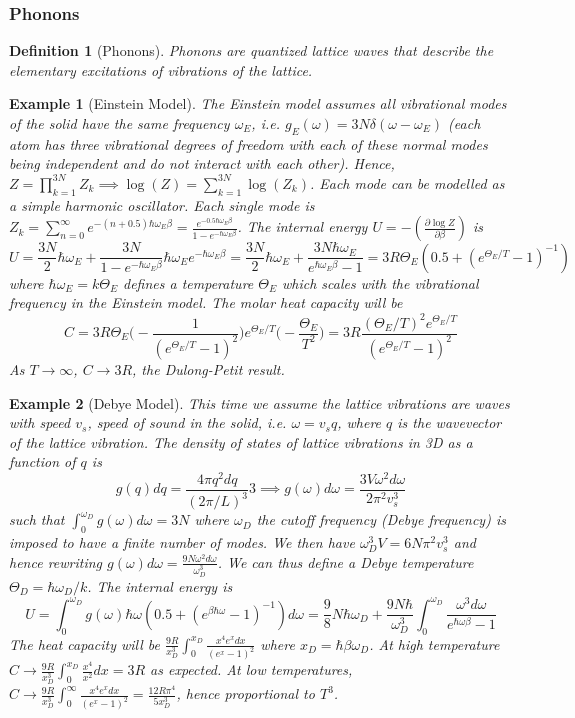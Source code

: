 \documentclass[a4paper]{article}
\newtheorem{eg}{Example}[section]
\theoremstyle{new}
\newtheorem{defi}{Definition}[section]
\begin{document}
\subsubsection*{Phonons}
\begin{defi}[Phonons]
Phonons are quantized lattice waves that describe the elementary excitations of vibrations of the lattice.
\end{defi}
\begin{eg}[Einstein Model]
The Einstein model assumes all vibrational modes of the solid have the same frequency $\omega_E$, i.e. $g_E(\omega)=3N\delta(\omega-\omega_E)$ (each atom has three vibrational degrees of freedom with each of these normal modes being independent and do not interact with each other). Hence, $Z=\prod_{k=1}^{3N}Z_k\implies\log(Z)=\sum_{k=1}^{3N}\log(Z_k)$. Each mode can be modelled as a simple harmonic oscillator. Each single mode is $Z_k=\sum_{n=0}^\infty e^{-(n+0.5)\hbar\omega_E\beta}=\frac{e^{-0.5\hbar\omega_E\beta}}{1-e^{-\hbar\omega_E\beta}}$. The internal energy $U=-(\frac{\partial\log Z}{\partial\beta})$ is
$$U=\frac{3N}{2}\hbar\omega_E+\frac{3N}{1-e^{-\hbar\omega_E\beta}}\hbar\omega_Ee^{-\hbar\omega_E\beta}=\frac{3N}{2}\hbar\omega_E+\frac{3N\hbar\omega_E}{e^{\hbar\omega_E\beta}-1}=3R\Theta_E(0.5+(e^{\Theta_E/T}-1)^{-1})$$
where $\hbar\omega_E=k\Theta_E$ defines a temperature $\Theta_E$ which scales with the vibrational frequency in the Einstein model. The molar heat capacity will be
$$C=3R\Theta_E\bigg(-\frac{1}{(e^{\Theta_E/T}-1)^2}\bigg)e^{\Theta_E/T}\bigg(-\frac{\Theta_E}{T^2}\bigg)=3R\frac{(\Theta_E/T)^2e^{\Theta_E/T}}{(e^{\Theta_E/T}-1)^2}$$
As $T\rightarrow\infty$, $C\rightarrow 3R$, the Dulong-Petit result.
\end{eg}
\begin{eg}[Debye Model]
This time we assume the lattice vibrations are waves with speed $v_s$, speed of sound in the solid, i.e. $\omega=v_sq$, where $q$ is the wavevector of the lattice vibration. The density of states of lattice vibrations in 3D as a function of $q$ is
$$g(q)dq=\frac{4\pi q^2dq}{(2\pi/L)^3}3\implies g(\omega)d\omega=\frac{3V\omega^2d\omega}{2\pi^2v_s^3}$$
such that $\int_0^{\omega_D}g(\omega)d\omega=3N$ where $\omega_D$ the cutoff frequency (Debye frequency) is imposed to have a finite number of modes. We then have $\omega_D^3V=6N\pi^2v_s^3$ and hence rewriting $g(\omega)d\omega=\frac{9N\omega^2d\omega}{\omega_D^3}$. We can thus define a Debye temperature $\Theta_D=\hbar\omega_D/k$. The internal energy is 
$$U=\int_0^{\omega_D}g(\omega)\hbar\omega(0.5+(e^{\beta\hbar\omega}-1)^{-1})d\omega=\frac{9}{8}N\hbar\omega_D+\frac{9N\hbar}{\omega_D^3}\int_0^{\omega_D}\frac{\omega^3d\omega}{e^{\hbar\omega\beta}-1}$$
The heat capacity will be $\frac{9R}{x_D^3}\int_0^{x_D}\frac{x^4e^xdx}{(e^x-1)^2}$ where $x_D=\hbar\beta\omega_D$. At high temperature $C\rightarrow\frac{9R}{x_D^3}\int_0^{x_D}\frac{x^4}{x^2}dx=3R$ as expected. At low temperatures, $C\rightarrow\frac{9R}{x_D^3}\int_0^\infty\frac{x^4e^xdx}{(e^x-1)^2}=\frac{12R\pi^4}{5x_D^3}$, hence proportional to $T^3$.
\end{eg}













\end{document}
